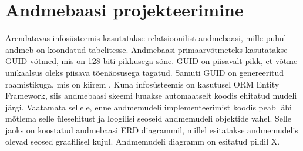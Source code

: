 \section{Andmebaasi projekteerimine}
Arendatavas infosüsteemis kasutatakse relatsioonilist andmebaasi, mille puhul andmeb on koondatud
tabelitesse. 
Andmebaasi primaarvõtmeteks kasutatakse GUID võtmed, mis on 128-biti pikkusega sõne.
GUID on piisavalt pikk, et võtme unikaalsus oleks piisava tõenäosusega tagatud. Samuti GUID on genereeritud
raamistikuga, mis on kiirem \cite{guid_definition}. Kuna infosüsteemis on kasutusel ORM Entity Framework, 
siis andmebaasi skeemi luuakse automaatselt koodis ehitatud mudeli järgi. Vaatamata sellele, enne 
andmemudeli implementeerimist koodis peab läbi mõtlema selle ülesehitust ja loogilisi seoseid andmemudeli
objektide vahel.
Selle jaoks on koostatud andmebaasi ERD diagrammil, millel esitatakse andmemudelis olevad seosed graafilisel
kujul. Andmemudeli diagramm on esitatud pildil X.
